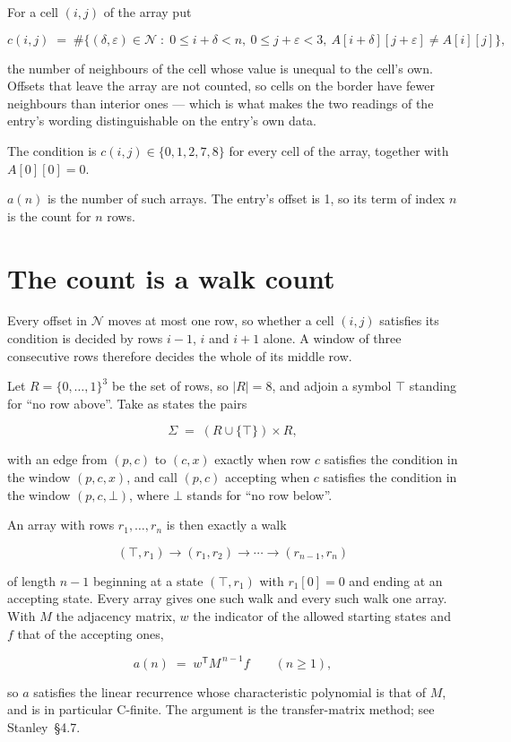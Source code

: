 \documentclass[11pt]{article}
\theoremstyle{definition}
\begin{document}
For a cell $(i,j)$ of the array put

\[c(i,j) \;=\; \#\bigl\{(\delta,\varepsilon)\in\mathcal{N} \;:\; 0\le i+\delta<n,\ 0\le j+\varepsilon<3,\ A[i+\delta][j+\varepsilon] \neq A[i][j]\bigr\},\]

the number of neighbours of the cell whose value is unequal to the cell's own. Offsets that leave the array are not counted, so cells on the border have fewer neighbours than interior ones --- which is what makes the two readings of the entry's wording distinguishable on the entry's own data.

The condition is $c(i,j) \in \{0, 1, 2, 7, 8\}$ for every cell of the array, together with $A[0][0]=0$.

$a(n)$ is the number of such arrays. The entry's offset is 1, so its term of index $n$ is the count for $n$ rows.

\section{The count is a walk count}

Every offset in $\mathcal{N}$ moves at most one row, so whether a cell $(i,j)$ satisfies its condition is decided by rows $i-1$, $i$ and $i+1$ alone. A window of three consecutive rows therefore decides the whole of its middle row.

Let $R = \{0,\dots,1\}^{3}$ be the set of rows, so $|R| = 8$, and adjoin a symbol $\top$ standing for ``no row above''. Take as states the pairs

\[\Sigma \;=\; (R \cup \{\top\}) \times R,\]

with an edge from $(p,c)$ to $(c,x)$ exactly when row $c$ satisfies the condition in the window $(p,c,x)$, and call $(p,c)$ accepting when $c$ satisfies the condition in the window $(p,c,\bot)$, where $\bot$ stands for ``no row below''.

An array with rows $r_1,\dots,r_n$ is then exactly a walk

\[(\top,r_1) \to (r_1,r_2) \to \cdots \to (r_{n-1},r_n)\]

of length $n-1$ beginning at a state $(\top,r_1)$ with $r_1[0]=0$ and ending at an accepting state. Every array gives one such walk and every such walk one array. With $M$ the adjacency matrix, $w$ the indicator of the allowed starting states and $f$ that of the accepting ones,

\[a(n) \;=\; w^{\mathsf T} M^{\,n-1} f \qquad (n \ge 1),\]

so $a$ satisfies the linear recurrence whose characteristic polynomial is that of $M$, and is in particular C-finite. The argument is the transfer-matrix method; see Stanley~\S4.7.
\end{document}
